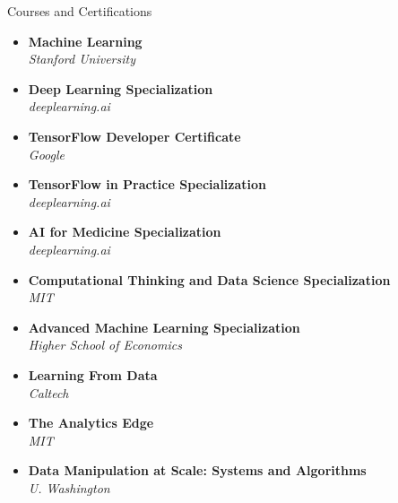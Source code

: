 \documentclass{cv}
\begin{document}
	
	\begin{rSection}{Courses and Certifications}
		\begin{itemize}

			\item {\bf Machine Learning}
			\\ {\em Stanford University}
			
			\item {\bf Deep Learning Specialization}
			\\ {\em deeplearning.ai}
			
			\item {\bf TensorFlow Developer Certificate}
			\\ {\em Google}
			
			\item {\bf TensorFlow in Practice Specialization}
			\\ {\em deeplearning.ai}
			
			\item {\bf AI for Medicine Specialization}
			\\ {\em deeplearning.ai}
			
			\item {\bf Computational Thinking and Data Science Specialization}
			\\ {\em MIT}
			
			\item {\bf Advanced Machine Learning Specialization}
			\\ {\em Higher School of Economics}
						
			\item {\bf Learning From Data} 
			\\ {\em Caltech}
			
			\item {\bf The Analytics Edge}
			\\ {\em MIT}
						
			\item {\bf Data Manipulation at Scale: Systems and Algorithms}
			\\ {\em U. Washington}
						
		\end{itemize}
			
	\end{rSection}
	
	
\end{document}
